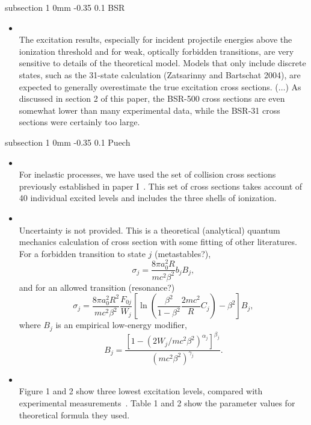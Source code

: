 \documentclass[11pt]{article}
\makeatletter
\renewcommand{\subsection}{\@startsection
{subsection}%
{1}%
{0mm}%
{-0.35\baselineskip}%
{0.1\baselineskip}%
{\normalfont\large\bfseries\color{myTan}}}%
\makeatother
\begin{document}
\subsection{BSR}
\begin{itemize}
\item \cite{Pitchford2013}\\
The excitation results, especially for incident projectile energies above the ionization threshold and for weak, optically forbidden transitions, are very sensitive to details of the theoretical model. Models that only include discrete states, such as the 31-state calculation (Zatsarinny and Bartschat 2004), are expected to generally overestimate the true excitation cross sections.
($\ldots$) As discussed in section 2 of this paper, the BSR-500 cross sections are even somewhat lower than many experimental data, while the BSR-31 cross sections were certainly too large.
\end{itemize}

\subsection{Puech}
\begin{itemize}
\item \cite{Puech1986}\\
For inelastic processes, we have used the set of collision cross sections previously established in paper I~\cite{Bretagne1986}.
This set of cross sections takes account of 40 individual excited levels and includes the three shells of ionization.
\item \cite{Bretagne1986}\\
Uncertainty is not provided. This is a theoretical (analytical) quantum mechanics calculation of cross section with some fitting of other literatures.
For a forbidden transition to state $j$ (metastables?),
\begin{equation}
\sigma_j = \frac{8\pi a_0^2 R}{mc^2\beta^2}b_jB_j,
\end{equation}
and for an allowed transition (resonance?)
\begin{equation}
\sigma_j = \frac{8\pi a_0^2 R^2}{mc^2\beta^2}\frac{F_{0j}}{W_j}\left[ \ln\left(\frac{\beta^2}{1-\beta^2}\frac{2mc^2}{R}C_j\right) - \beta^2 \right]B_j,
\end{equation}
where $B_j$ is an empirical low-energy modifier,
\begin{equation}
B_j = \frac{ [ 1 - (2W_j/mc^2\beta^2)^{\alpha_j} ]^{\beta_j} }{(mc^2\beta^2)^{\gamma_j}}.
\end{equation}
\item \cite{Bretagne1986}\\
Figure 1 and 2 show three lowest excitation levels, compared with experimental measurements~\cite{Chutjian1981}. Table 1 and 2 show the parameter values for theoretical formula they used.
\end{itemize}
\end{document}
